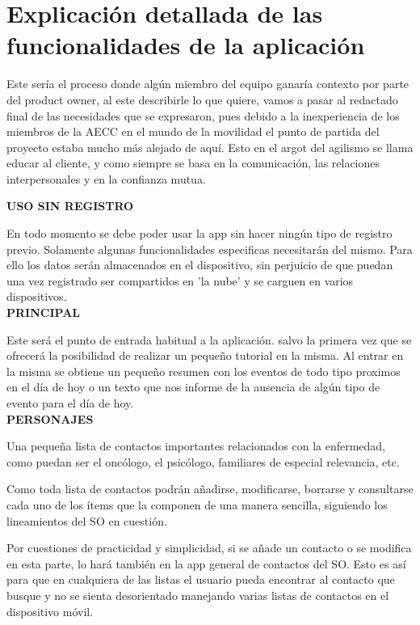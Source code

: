 \documentclass[../pfc.tex]{subfiles}
\begin{document}
	\section{Explicación detallada de las funcionalidades de la aplicación}

Este sería el proceso donde algún miembro del equipo ganaría contexto por parte del product owner, al este describirle lo que quiere, vamos a pasar al redactado final de las necesidades que se expresaron, pues debido a la inexperiencia de los miembros de la AECC en el mundo de la movilidad el punto de partida del proyecto estaba mucho más alejado de aquí. Esto en el argot del agilismo se llama educar al cliente, y como siempre se basa en la comunicación, las relaciones interpersonales y en la confianza mutua.

\textbf{USO SIN REGISTRO}

En todo momento se debe poder usar la app sin hacer ningún tipo de registro previo. Solamente algunas funcionalidades especificas necesitarán del mismo. Para ello los datos serán almacenados en el dispositivo, sin perjuicio de que puedan una vez registrado ser compartidos en 'la nube' y se carguen en varios dispositivos.\\

	\textbf{PRINCIPAL}
	
	Este será el punto de entrada habitual a la aplicación. salvo la primera vez que se ofrecerá la posibilidad de realizar un pequeño tutorial en la misma. Al entrar en la misma se obtiene un pequeño resumen con los eventos de todo tipo proximos en el día de hoy o un texto que nos informe de la ausencia de algún tipo de evento para el día de hoy.\\
	
	\textbf{PERSONAJES}
	
	Una pequeña lista de contactos importantes relacionados con la enfermedad, como puedan ser el oncólogo, el psicólogo, familiares de especial relevancia, etc.
	
	Como toda lista de contactos podrán añadirse, modificarse, borrarse y consultarse cada uno de los ítems que la componen de una manera sencilla, siguiendo los lineamientos del SO en cuestión.
	
	Por cuestiones de practicidad y simplicidad, si se añade un contacto o se modifica en esta parte, lo hará también en la app general de contactos del SO. Esto es así para que en cualquiera de las listas el usuario pueda encontrar al contacto que busque y no se sienta desorientado manejando varias listas de contactos en el dispositivo móvil. \\
	
\end{document}
